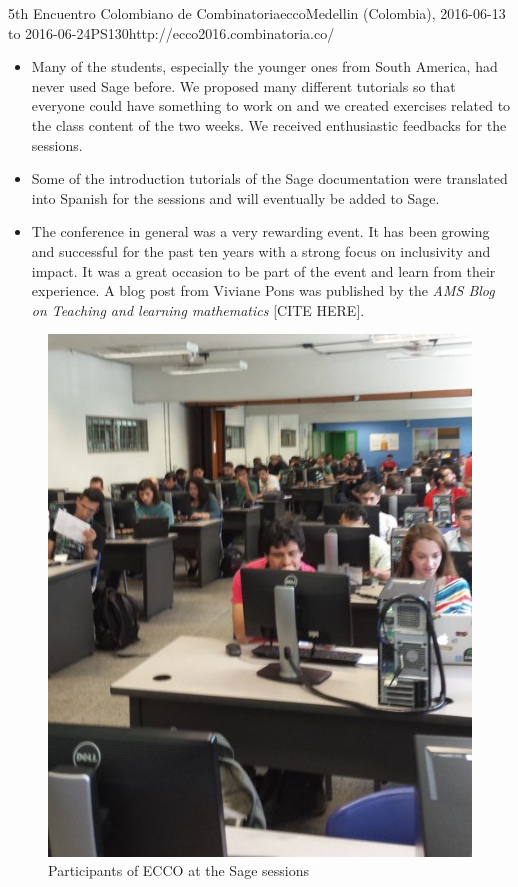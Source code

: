 \begin{event}{5th Encuentro Colombiano de Combinatoria}{ecco}{Medellin (Colombia), 2016-06-13 to 2016-06-24}{PS}{130}{http://ecco2016.combinatoria.co/}
\begin{itemize}
\item Many of the students, especially the younger ones from South America, had never used
Sage before. We proposed many different tutorials so that everyone could have something to
work on and we created exercises related to the class content of the two weeks. We received
 enthusiastic feedbacks for the sessions.

\item Some of the introduction tutorials of the Sage documentation were translated into 
Spanish for the sessions and will eventually be added to Sage.

\item The conference in general was a very rewarding event. It has been growing and successful
for the past ten years with a strong focus on inclusivity and impact. It was a great occasion
to be part of the event and learn from their experience. A blog post from Viviane Pons was
published by the \emph{AMS Blog on Teaching and learning mathematics} [CITE HERE].
\end{itemize}



\begin{figure}[ht]
\caption*{Participants of ECCO at the Sage sessions}
\includegraphics[scale=0.5]{pictures/ECCO-1.jpg}


\end{figure}
\end{event}
